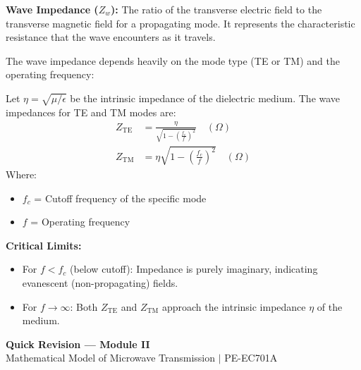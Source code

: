 \documentclass[12pt,a4paper]{article}
\begin{document}
\begin{tcolorbox}[defbox]
\textbf{Wave Impedance ($Z_w$):} The ratio of the transverse electric field to the transverse magnetic field for a propagating mode. It represents the characteristic resistance that the wave encounters as it travels.
\end{tcolorbox}

The wave impedance depends heavily on the mode type (TE or TM) and the operating frequency:

\begin{tcolorbox}[formulabox, title={\textbf{Wave Impedance Formulations}}]
Let $\eta = \sqrt{\mu/\epsilon}$ be the intrinsic impedance of the dielectric medium. The wave impedances for TE and TM modes are:
\begin{align}
  Z_{\text{TE}} &= \frac{\eta}{\sqrt{1 - \left(\frac{f_c}{f}\right)^{\!2}}} \quad (\Omega) \\
  Z_{\text{TM}} &= \eta \sqrt{1 - \left(\frac{f_c}{f}\right)^{\!2}} \quad (\Omega)
\end{align}
Where:
\begin{itemize}[leftmargin=1.5em, itemsep=1pt, topsep=2pt]
  \item[] $f_c$ = Cutoff frequency of the specific mode
  \item[] $f$ = Operating frequency
\end{itemize}
\textbf{Critical Limits:}
\begin{itemize}[leftmargin=1.5em, itemsep=1pt]
  \item For $f < f_c$ (below cutoff): Impedance is purely imaginary, indicating evanescent (non-propagating) fields.
  \item For $f \to \infty$: Both $Z_{\text{TE}}$ and $Z_{\text{TM}}$ approach the intrinsic impedance $\eta$ of the medium.
\end{itemize}
\end{tcolorbox}

\newpage
\begin{center}
  {\large\bfseries\color{myred} Quick Revision --- Module II}\\[3pt]
  {\small\color{mydark} Mathematical Model of Microwave Transmission $|$ PE-EC701A}
\end{center}
\noindent{\color{myred}\rule{\linewidth}{1.2pt}}
\vspace{4pt}
\end{document}
